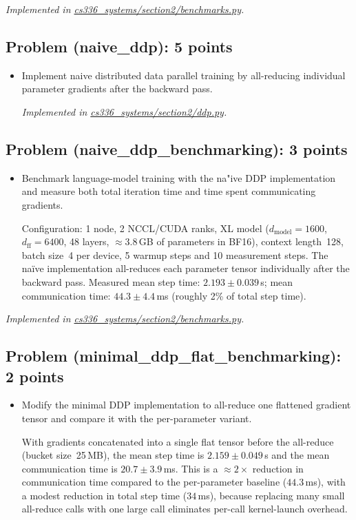 \documentclass[letterpaper]{article}
\newcommand{\repofile}[2]{\href{https://github.com/echung32/ece405-assignment4-hpc/blob/main/#1}{#2}}
\begin{document}
	\textit{Implemented in  \repofile{cs336_systems/section2/benchmarks.py}{cs336\_systems/section2/benchmarks.py}.}
	
	\subsection{Problem (naive\_ddp): 5 points}
	
	\begin{itemize}
		\item[(a)] Implement naive distributed data parallel training by all-reducing individual parameter gradients after the backward pass.
		
		\textit{Implemented in \repofile{cs336_systems/section2/ddp.py}{cs336\_systems/section2/ddp.py}.}
	\end{itemize}
	
	\subsection{Problem (naive\_ddp\_benchmarking): 3 points}
	
	\begin{itemize}
		\item[(a)] Benchmark language-model training with the na"{i}ve DDP implementation and measure both total iteration time and time spent communicating gradients.
		
		Configuration: 1 node, 2 NCCL/CUDA ranks, XL model ($d_{\text{model}}=1600$, $d_{\text{ff}}=6400$, 48 layers, $\approx$3.8\,GB of parameters in BF16), context length~128, batch size~4 per device, 5 warmup steps and 10 measurement steps.
		The na\"ive implementation all-reduces each parameter tensor individually after the backward pass.
		Measured mean step time: $2.193 \pm 0.039$\,s; mean communication time: $44.3 \pm 4.4$\,ms (roughly 2\% of total step time).
	\end{itemize}
	
	\textit{Implemented in \repofile{cs336_systems/section2/benchmarks.py}{cs336\_systems/section2/benchmarks.py}.}
	
	\subsection{Problem (minimal\_ddp\_flat\_benchmarking): 2 points}
	
	\begin{itemize}
		\item[(a)] Modify the minimal DDP implementation to all-reduce one flattened gradient tensor and compare it with the per-parameter variant.
		
		With gradients concatenated into a single flat tensor before the all-reduce (bucket size~25\,MB), the mean step time is $2.159 \pm 0.049$\,s and the mean communication time is $20.7 \pm 3.9$\,ms.
		This is a $\approx\!2\times$ reduction in communication time compared to the per-parameter baseline ($44.3$\,ms), with a modest reduction in total step time ($34$\,ms), because replacing many small all-reduce calls with one large call eliminates per-call kernel-launch overhead.
	\end{itemize}
	
\end{document}
